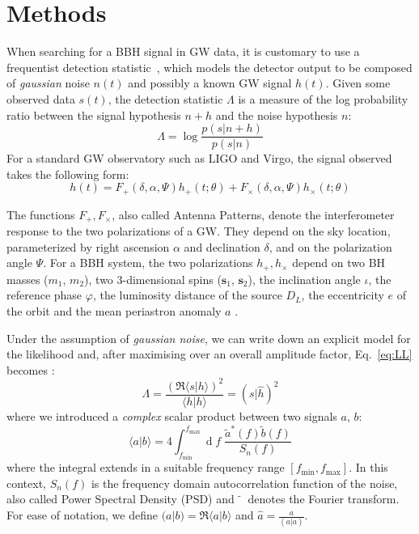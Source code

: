 \documentclass[twocolumn,showpacs,preprintnumbers,nofootinbib,prd,
superscriptaddress,10pt]{revtex4-2}
\renewcommand{\d}[1]{\ensuremath{\operatorname{d}\!{#1}}}
\newcommand{\scalar}[2]{\langle #1|#2 \rangle}
\newcommand{\rescalar}[2]{( #1 |#2 )}
\begin{document}
\section{Methods} \label{sec:methods}

When searching for a BBH signal in GW data, it is customary to use a frequentist detection statistic~\cite{Creighton_book, Maggiore:2007ulw, Harry:2016ijz, Harry:2017weg}, which models the detector output to be composed of {\it gaussian} noise $n(t)$ and possibly a known GW signal $h(t)$.
Given some observed data $s(t)$, the detection statistic $\Lambda$ is a measure of the log probability ratio between the signal hypothesis $n+h$ and the noise hypothesis $n$:
\begin{equation}\label{eq:LL}
	\Lambda = \log\frac{p(s|n+h)}{p(s| n)}
\end{equation}
For a standard GW observatory such as LIGO and Virgo, the signal observed takes the following form:
\begin{equation}\label{eq:signal_model}
	h(t) = F_+(\delta, \alpha, \Psi) h_+(t;\theta) + F_\times(\delta, \alpha, \Psi) h_\times(t;\theta)
\end{equation}

The functions $F_+, F_\times$, also called Antenna Patterns, denote the interferometer response to the two polarizations of a GW. They depend on the sky location, parameterized by right ascension $\alpha$ and declination $\delta$, and on the polarization angle $\Psi$. 
For a BBH system, the two polarizations $h_+, h_\times$ depend on two BH masses ($m_1$, $m_2$), two 3-dimensional spins ($\mathbf{s}_1$, $\mathbf{s}_2$), the inclination angle $\iota$, the reference phase $\varphi$, the luminosity distance of the source $D_L$, the eccentricity $e$ of the orbit and the mean periastron anomaly $a$ \cite{Sathyaprakash_2009}.

Under the assumption of {\it gaussian noise}, we can write down an explicit model for the likelihood and, after maximising over an overall amplitude factor, Eq.~\eqref{eq:LL} becomes \cite{Creighton_book, Maggiore:2007ulw, Harry:2016ijz}:
\begin{equation}\label{eq:LL_gauss}
	\Lambda = \frac{\left(\Re\scalar{s}{h}\right)^2}{\scalar{h}{h}} = \rescalar{s}{\hat{h}}^2
\end{equation}
where we introduced a {\it complex} scalar product between two signals $a$, $b$:
\begin{equation} \label{eq:scalar_product}
	\scalar{a}{b} = 4 \int_{f_\text{min}}^{f_\text{max}} \!\!\!\! \d{f} \; \frac{\tilde{a}^*(f) \tilde{b}(f)}{S_n(f)}
\end{equation}
where the integral extends in a suitable frequency range $[f_\text{min}, f_\text{max}]$.
In this context, $S_n(f)$ is the frequency domain autocorrelation function of the noise, also called Power Spectral Density (PSD) and $\tilde{\phantom{a}}$ denotes the Fourier transform.
For ease of notation, we define ${\rescalar{a}{b} = \Re\scalar{a}{b}}$ and ${\hat{a} = \frac{a}{\rescalar{a}{a}}}$.
\end{document}
